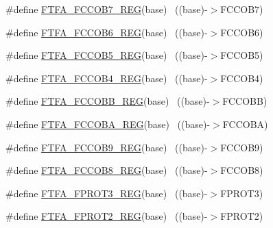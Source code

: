 \begin{DoxyCompactItemize}
\item 
\#define \hyperlink{group___f_t_f_a___register___accessor___macros_gad9fc89549f328df41998985ead47787f}{F\+T\+F\+A\+\_\+\+F\+C\+C\+O\+B7\+\_\+\+R\+EG}(base)                                    ~((base)-\/$>$F\+C\+C\+O\+B7)
\item 
\#define \hyperlink{group___f_t_f_a___register___accessor___macros_ga2ec58dae090a1b1b913f54c471adf487}{F\+T\+F\+A\+\_\+\+F\+C\+C\+O\+B6\+\_\+\+R\+EG}(base)                                    ~((base)-\/$>$F\+C\+C\+O\+B6)
\item 
\#define \hyperlink{group___f_t_f_a___register___accessor___macros_gae2ba71f5a4075ff2dc247486ae967164}{F\+T\+F\+A\+\_\+\+F\+C\+C\+O\+B5\+\_\+\+R\+EG}(base)                                    ~((base)-\/$>$F\+C\+C\+O\+B5)
\item 
\#define \hyperlink{group___f_t_f_a___register___accessor___macros_gaddb45289113c9883558fc0816b3e5eca}{F\+T\+F\+A\+\_\+\+F\+C\+C\+O\+B4\+\_\+\+R\+EG}(base)                                    ~((base)-\/$>$F\+C\+C\+O\+B4)
\item 
\#define \hyperlink{group___f_t_f_a___register___accessor___macros_ga5f79719251a91c46a0580e66de88cb4e}{F\+T\+F\+A\+\_\+\+F\+C\+C\+O\+B\+B\+\_\+\+R\+EG}(base)                                    ~((base)-\/$>$F\+C\+C\+O\+BB)
\item 
\#define \hyperlink{group___f_t_f_a___register___accessor___macros_ga536ccf6bf31e3ff5580f663e45dcaa81}{F\+T\+F\+A\+\_\+\+F\+C\+C\+O\+B\+A\+\_\+\+R\+EG}(base)                                    ~((base)-\/$>$F\+C\+C\+O\+BA)
\item 
\#define \hyperlink{group___f_t_f_a___register___accessor___macros_gafd2b7a5168a9fcb50d59eb3594537287}{F\+T\+F\+A\+\_\+\+F\+C\+C\+O\+B9\+\_\+\+R\+EG}(base)                                    ~((base)-\/$>$F\+C\+C\+O\+B9)
\item 
\#define \hyperlink{group___f_t_f_a___register___accessor___macros_ga19663a48847b0be87b4777ea8f924920}{F\+T\+F\+A\+\_\+\+F\+C\+C\+O\+B8\+\_\+\+R\+EG}(base)                                    ~((base)-\/$>$F\+C\+C\+O\+B8)
\item 
\#define \hyperlink{group___f_t_f_a___register___accessor___macros_gac6f1f2c459468aeb404a9eba46d54c5e}{F\+T\+F\+A\+\_\+\+F\+P\+R\+O\+T3\+\_\+\+R\+EG}(base)                                    ~((base)-\/$>$F\+P\+R\+O\+T3)
\item 
\#define \hyperlink{group___f_t_f_a___register___accessor___macros_ga35897dbfbff1d92db497e4c553692eda}{F\+T\+F\+A\+\_\+\+F\+P\+R\+O\+T2\+\_\+\+R\+EG}(base)                                    ~((base)-\/$>$F\+P\+R\+O\+T2)

\end{DoxyCompactItemize}

